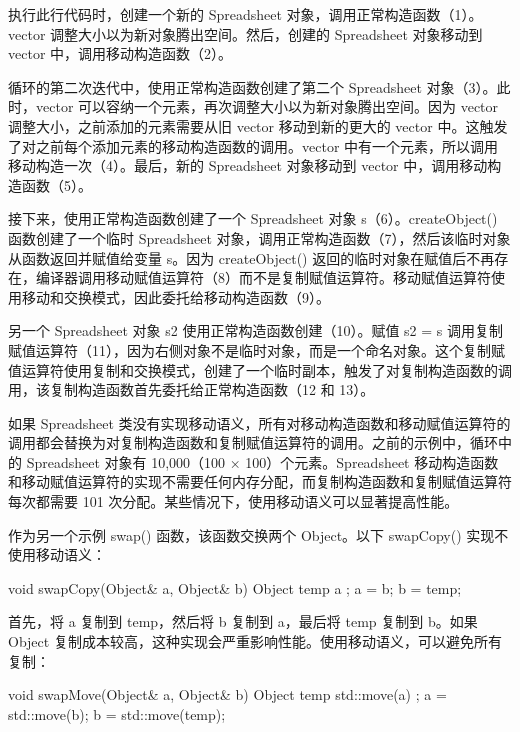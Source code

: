执行此行代码时，创建一个新的 Spreadsheet 对象，调用正常构造函数（1）。vector 调整大小以为新对象腾出空间。然后，创建的 Spreadsheet 对象移动到 vector 中，调用移动构造函数（2）。

循环的第二次迭代中，使用正常构造函数创建了第二个 Spreadsheet 对象（3）。此时，vector 可以容纳一个元素，再次调整大小以为新对象腾出空间。因为 vector 调整大小，之前添加的元素需要从旧 vector 移动到新的更大的 vector 中。这触发了对之前每个添加元素的移动构造函数的调用。vector 中有一个元素，所以调用移动构造一次（4）。最后，新的 Spreadsheet 对象移动到 vector 中，调用移动构造函数（5）。

接下来，使用正常构造函数创建了一个 Spreadsheet 对象 s（6）。createObject() 函数创建了一个临时 Spreadsheet 对象，调用正常构造函数（7），然后该临时对象从函数返回并赋值给变量 s。因为 createObject() 返回的临时对象在赋值后不再存在，编译器调用移动赋值运算符（8）而不是复制赋值运算符。移动赋值运算符使用移动和交换模式，因此委托给移动构造函数（9）。

另一个 Spreadsheet 对象 s2 使用正常构造函数创建（10）。赋值 s2 = s 调用复制赋值运算符（11），因为右侧对象不是临时对象，而是一个命名对象。这个复制赋值运算符使用复制和交换模式，创建了一个临时副本，触发了对复制构造函数的调用，该复制构造函数首先委托给正常构造函数（12 和 13）。

如果 Spreadsheet 类没有实现移动语义，所有对移动构造函数和移动赋值运算符的调用都会替换为对复制构造函数和复制赋值运算符的调用。之前的示例中，循环中的 Spreadsheet 对象有 10,000（100 × 100）个元素。Spreadsheet 移动构造函数和移动赋值运算符的实现不需要任何内存分配，而复制构造函数和复制赋值运算符每次都需要 101 次分配。某些情况下，使用移动语义可以显著提高性能。


作为另一个示例 swap() 函数，该函数交换两个 Object。以下 swapCopy() 实现不使用移动语义：

\begin{cpp}
void swapCopy(Object& a, Object& b)
{
    Object temp { a };
    a = b;
    b = temp;
}
\end{cpp}

首先，将 a 复制到 temp，然后将 b 复制到 a，最后将 temp 复制到 b。如果 Object 复制成本较高，这种实现会严重影响性能。使用移动语义，可以避免所有复制：

\begin{cpp}
void swapMove(Object& a, Object& b)
{
    Object temp { std::move(a) };
    a = std::move(b);
    b = std::move(temp);
}
\end{cpp}

